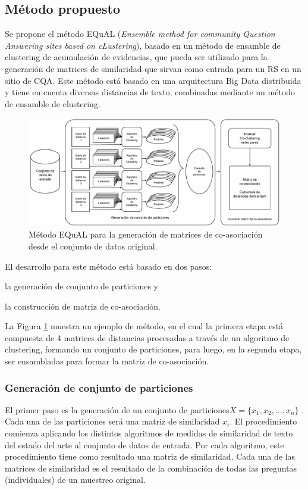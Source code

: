 \subsection{Método propuesto}
Se propone el método EQuAL (\textit{Ensemble method for community Question Answering sites based on cLustering}), basado en un método de ensamble de clustering de acumulación de evidencias, que pueda ser utilizado para la generación de matrices de similaridad que sirvan como entrada para un RS en un sitio de CQA. Este método está basado en una arquitectura Big Data distribuida y tiene en cuenta diversas distancias de texto, combinadas mediante un método de ensamble de clustering.

\begin{figure}[h!]
	\centering
	\includegraphics[width=0.9\linewidth]{8_problema_investigacion/imagenes/metodo_equal}
	\caption{Método EQuAL para la generación de matrices de co-asociación desde el conjunto de datos original.}
	\label{fig:metodoequal}
\end{figure}

El desarrollo para este método está basado en dos pasos: \begin{enumerate*} [label=(\roman*)] \item la generación de conjunto de particiones y \item la construcción de matriz de co-asociación. \end{enumerate*} La Figura \ref{fig:metodoequal} muestra un ejemplo de método, en el cual la primera etapa está compuesta de 4 matrices de distancias procesadas a través de un algoritmo de clustering, formando un conjunto de particiones, para luego, en la segunda etapa, ser ensambladas para formar la matriz de co-asociación.


\subsubsection{Generación de conjunto de particiones}
El primer paso es la generación de un conjunto de particiones\(X = \{x_1, x_2,... , x_n\}\) . Cada una de las particiones será una matriz de similaridad \(x_i\). El procedimiento comienza aplicando los distintos algoritmos de medidas de similaridad de texto del estado del arte al conjunto de datos de entrada. Por cada algoritmo, este procedimiento tiene como resultado una matriz de similaridad. Cada una de las matrices de similaridad es el resultado de la combinación de todas las preguntas (individuales) de un muestreo original.

